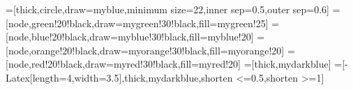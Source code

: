 
\usetikzlibrary{arrows.meta} %
\contourlength{1.4pt}
\tikzset{>=latex} %
=[thick,circle,draw=myblue,minimum size=22,inner sep=0.5,outer sep=0.6]
=[node,green!20!black,draw=mygreen!30!black,fill=mygreen!25]
=[node,blue!20!black,draw=myblue!30!black,fill=myblue!20]
=[node,orange!20!black,draw=myorange!30!black,fill=myorange!20]
=[node,red!20!black,draw=myred!30!black,fill=myred!20]
=[thick,mydarkblue] %
=[-{Latex[length=4,width=3.5]},thick,mydarkblue,shorten <=0.5,shorten >=1]
\def\nstyle{int(\lay<\Nnodlen?min(2,\lay):3)} %



